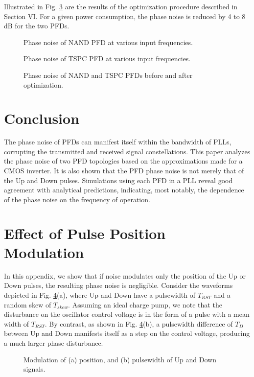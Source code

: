 Illustrated in Fig. \ref{pfdoptim} are the results of the optimization procedure described in Section VI. For a given power consumption, the phase noise is
reduced by 4 to 8 dB for the two PFDs.

\begin{figure}[hbt]
\vspace{2.8in}
\caption{Phase noise of NAND PFD at various input frequencies.}
\label{pfdnandsim}
\end{figure} 
\begin{figure}[hbt]
\vspace{2.8in}
\caption{Phase noise of TSPC PFD at various input frequencies.}
\label{pfdtspcsim}
\end{figure} 
\begin{figure}[hbt]
\vspace{2.8in}
\caption{Phase noise of NAND and TSPC PFDs before and after optimization.}
\label{pfdoptim}
\end{figure} 


\section{Conclusion}
The phase noise of PFDs can manifest itself within the bandwidth of PLLs, corrupting the transmitted and received signal constellations. This paper
analyzes the phase noise of two PFD topologies based on the approximations made for a CMOS inverter. It is also shown that the PFD phase noise is
not merely that of the Up and Down pulses. Simulations using each PFD in a PLL reveal good agreement with analytical predictions, indicating, most
notably, the dependence of the phase noise on the frequency of operation.

\appendices 

\section{Effect of Pulse Position Modulation}
In this appendix, we show that if noise modulates only the position of the Up or Down pulses, the resulting phase noise is negligible. Consider the waveforms
depicted in Fig. \ref{ppmcompare}(a), where Up and Down have a pulsewidth of $T_{RST}$ and a random skew of $T_{skew}$. Assuming an ideal charge pump, we note that the
disturbance on the oscillator control voltage is in the form of a pulse with a mean width of $T_{RST}$. By contrast, as shown in Fig. \ref{ppmcompare}(b), a pulsewidth
difference of $T_D$ between Up and Down manifests itself as a step on the control voltage, producing a much larger phase disturbance. 
\begin{figure}[htb]
\vspace{2.8in}
\caption{Modulation of (a) position, and (b) pulsewidth of Up and Down signals.}
\label{ppmcompare}
\end{figure}

